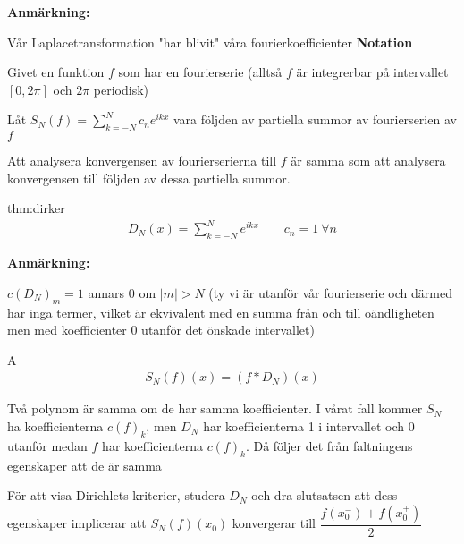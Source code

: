 \par\bigskip
\noindent\textbf{Anmärkning:}\par
\noindent Vår Laplacetransformation "har blivit" våra fourierkoefficienter
\newpage
\noindent\textbf{Notation}\par
\noindent Givet en funktion $f$ som har en fourierserie (alltså $f$ är integrerbar på intervallet $[0,2\pi]$ och $2\pi$ periodisk) \par
\noindent Låt $S_N(f) = \sum_{k=-N}^{N}c_ne^{ikx}$ vara följden av partiella summor av fourierserien av $f$ 
\par\bigskip
\noindent Att analysera konvergensen av fourierserierna till $f$ är samma som att analysera konvergensen till följden av dessa partiella summor. 
\par\bigskip
\begin{theo}{thm:dirker}
  \begin{equation*}
    \begin{gathered}
      D_N(x) = \sum_{k=-N}^{N}e^{ikx}\qquad c_n = 1\:\forall n
    \end{gathered}
  \end{equation*}
\end{theo}
\par\bigskip
\noindent\textbf{Anmärkning:}\par
\noindent $c(D_N)_m = 1$ annars 0 om $\left|m\right|>N$ (ty vi är utanför vår fourierserie och därmed har inga termer, vilket är ekvivalent med en summa från och till oändligheten men med koefficienter 0 utanför det önskade intervallet)
\par\bigskip
\begin{theo}
  A
  \begin{equation*}
    \begin{gathered}
      S_N(f)(x) = (f*D_N)(x)
    \end{gathered}
  \end{equation*}
\end{theo}
\par\bigskip
\noindent Två polynom är samma om de har samma koefficienter. I vårat fall kommer $S_N$ ha koefficienterna $c(f)_k$, men $D_N$ har koefficienterna 1 i intervallet och 0 utanför medan $f$ har koefficienterna $c(f)_k$. Då följer det från faltningens egenskaper att de är samma
\par\bigskip
\noindent För att visa Dirichlets kriterier, studera $D_N$ och dra slutsatsen att dess egenskaper implicerar att $S_N(f)(x_0)$ konvergerar till $\dfrac{f(x_0^-)+f(x_0^+)}{2}$ 
